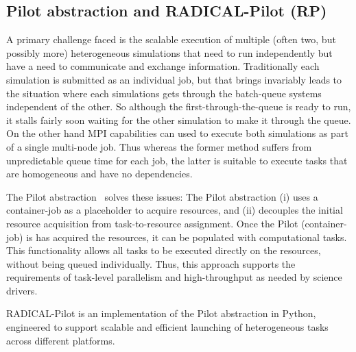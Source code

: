 \documentclass[preprint,11pt,authoryear]{elsarticle}
\begin{document}
\subsection{Pilot abstraction and RADICAL-Pilot (RP)}
A primary challenge faced is the scalable execution of multiple (often two,
but possibly more) heterogeneous simulations that need to run independently
but have a need to communicate and exchange information. Traditionally each
simulation is submitted as an individual job, but that brings invariably leads
to the situation where each simulations gets through the batch-queue systems
independent of the other. So although the first-through-the-queue is ready to
run, it stalls fairly soon waiting for the other simulation to make it through
the queue.  On the other hand MPI capabilities can used to  execute both
simulations as part of a single multi-node job.  Thus whereas the former
method suffers from unpredictable queue time for each job, the latter is
suitable to execute tasks that are homogeneous and have no dependencies.


The Pilot abstraction~\cite{pstar12} solves these issues:  The Pilot abstraction 
(i) uses a container-job as a placeholder to acquire resources, and (ii) decouples 
the initial resource acquisition from task-to-resource assignment. Once the 
Pilot (container-job) is has acquired the resources, it can be populated with 
computational tasks. This functionality allows all tasks to be executed directly 
on the resources, without being queued individually. Thus, this approach supports 
the requirements of task-level parallelism and high-throughput as needed by 
science drivers.


RADICAL-Pilot is an implementation of the Pilot abstraction in Python, engineered to
support scalable and efficient launching of heterogeneous tasks across different platforms.
\end{document}
